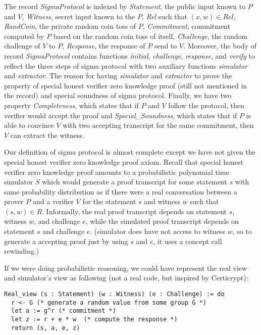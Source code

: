 \noindent
The record \textit{SigmaProtocol} is indexed by \textit{Statement}, the public input 
known to $P$ and $V$, \textit{Witness}, secret input known to the $P$, 
\textit{Rel} such that $(x, w) \in Rel$, \textit{RandCoin}, the private 
random coin toss of $P$, \textit{Commitment}, commitment computed 
by $P$ based on the random coin toss of itself, 
\textit{Challenge}, the random challenge of $V$ to $P$, 
\textit{Response}, the response of $P$ send to $V$. Moreover, 
the body of record \textit{SigmaProtocol} contains
functions \textit{initial}, \textit{challenge}, \textit{response}, and \textit{verify}
to reflect the three steps of sigma protocol with two auxiliary 
functions \textit{simulator} and \textit{extractor}.  The 
reason for having \textit{simulator} and \textit{extractor} 
to prove the property of special honest verifier zero knowledge proof 
(still not mentioned in the record) and special soundness of 
sigma protocol. Finally, we have two property \textit{Completeness}, 
which states that if $P$ and $V$ follow the protocol, then 
verifier would accept the proof and \textit{Special\_Soundness},
which states that if $P$ is able to convince $V$ with two 
accepting transcript for the same commitment, then $V$ can extract the witness. 


\noindent
Our definition of sigma protocol is almost complete except we have not given 
the special honest verifier zero knowledge proof axiom.  Recall that special honest 
verifier zero knowledge proof amounts to a probabilistic polynomial time simulator 
$S$ which would generate a proof transcript for some statement 
$s$  with same probability distribution as if there were a real 
conversation between a prover $P$ and a verifier $V$ 
for the statement $s$ and witness $w$ such that $(s, w) \in  R$.
Informally, the real proof transcript depends on statement $s$, witness $w$,  
and challenge $e$, 
while the simulated proof transcript depends on statement $s$ and challenge $e$. 
(simulator does have not access to witness $w$, so to generate a accepting 
proof just by using $s$ and $e$, it uses a concept call rewinding.)


If we were doing probabilistic reasoning, we could have represent the real view and 
simulator's view as following (not a real code, but inspired by Certicrypt):

\begin{verbatim}
Real_view (s : Statement) (w : Witness) (e : Challenge) := do
  r <- G (* generate a random value from some group G *)
  let a := g^r (* commitment *)
  let z := r + e * w  (* compute the response *)
  return (s, a, e, z)
\end{verbatim}


